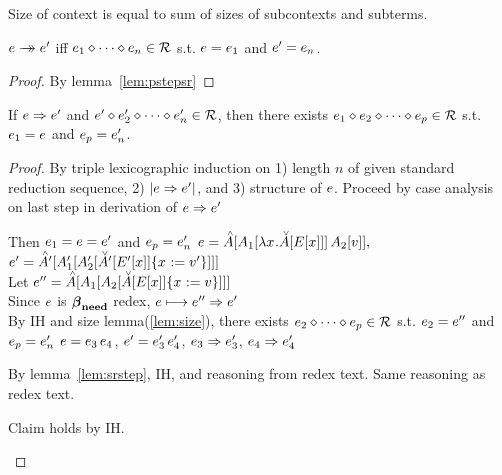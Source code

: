 \documentclass{article}
\begin{document}
%
%
\begin{definition}
Size of context is equal to sum of sizes of subcontexts and subterms.
\end{definition}



%
%
\begin{theorem}
$\e \steps \e'$ iff $\srseqe{n}$ s.t. $\e = \e_1$ and $\e' = \e_n$.
\end{theorem}

\begin{proof}
By lemma~\ref{lem:pstepsr}
\end{proof}


%
%
\begin{lemma}
\label{lem:pstepsr}
If $\e \pstep \e'$ and $\e' \srseqop \srseq{\e_2'}{\e_n'}$, then there exists
$\srseqconse[_1] \srseq{\e_2}{\e_p}$ s.t. $\e_1 = \e$ and $\e_p = \e_n'$.
\end{lemma}

\begin{proof}
By triple lexicographic induction on 1) length $n$ of given standard reduction
sequence, 2) $\size{\e \pstep \e'}$, and 3) structure of $\e$. Proceed by case
analysis on last step in derivation of $\e \pstep \e'$
\begin{byCases}
   Then $\e_1 = \e = \e'$ and $\e_p = \e_n'$
  $\e = \inAp{\ap{\inA[_1]{\lx\inAm{\Ex}}}{\inA[_2]{\val}}},$\\
  $\e' = \inAp[']{\inA[_1']{\inA[_2']{\substx{\inAm[']{\Ex[']}}{\val'}}}}$\\
  Let $\e'' = \inAp{\inA[_1]{\inA[_2]{\substx{\inAm{\Ex}}{\val}}}}$ \\
  Since $\e$ is $\betaneednr$ redex,
  $\e \srstep \e'' \pstep\e'$\\
  By IH and size lemma(\ref{lem:size}), there exists $\srseq{\e_2}{e_p}$ s.t.
  $\e_2 = \e''$ and $\e_p = \e_n'$
  $e = \ap{e_3}{e_4}$, $e' = \ap{e_3'}{e_4'}$, 
  $e_3 \pstep e_3'$, $e_4 \pstep e_4'$
  \begin{byCases}
  \renewcommand{\byCasesCaseTemplate}[1]{\textbf{Subcase {#1}.}}
    By lemma~\ref{lem:srstep}, IH, and reasoning from redex text.
    Same reasoning as redex text.
  \end{byCases}
  Claim holds by IH.
\end{byCases}
\end{proof}
\end{document}
